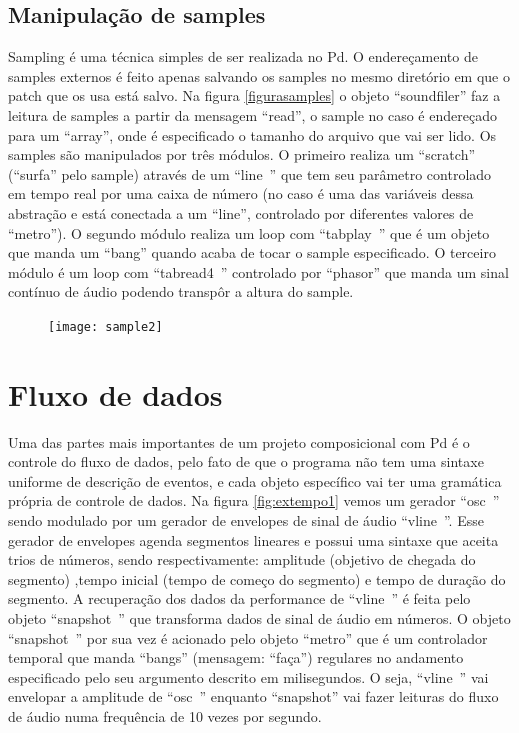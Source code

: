\documentclass[12pt]{article}
\begin{document}
\subsection{Manipulação de samples}
\label{sec:manip-de-sampl}
Sampling é uma técnica simples de ser realizada no Pd. O endereçamento de samples externos é feito apenas 
salvando os samples no mesmo diretório em que o patch que os usa está salvo. Na figura 
\ref{figurasamples} o objeto “soundfiler” faz a leitura de samples a partir da mensagem “read”, o sample 
no caso é endereçado para um “array”, onde é especificado o tamanho do arquivo que vai ser lido. Os samples 
são manipulados por três módulos. O primeiro realiza um “scratch” (“surfa” pelo sample) através de um 
“line~” que tem seu parâmetro controlado em tempo real por uma caixa de número (no caso é uma das 
variáveis dessa abstração e está conectada a um “line”, controlado por diferentes valores de “metro”).  
O segundo módulo realiza um loop com “tabplay~” que é um objeto que manda um “bang” quando acaba 
de tocar o sample especificado. O terceiro módulo é um loop com “tabread4~” controlado por “phasor” que 
manda um sinal contínuo de áudio podendo transpôr a altura do sample.

\begin{figure}[hp]
  \centering
  \texttt{[image: sample2]}
  \caption{}
    \label{fig:}
\end{figure}

\section{Fluxo de dados}
\label{sec:fluxo-de-dados}

Uma das partes mais importantes de um projeto composicional com Pd é o controle do fluxo de dados,
 pelo fato de que o programa não tem uma sintaxe uniforme de descrição de eventos, e cada objeto específico 
 vai ter uma gramática própria de controle de dados. Na figura \ref{fig:extempo1} vemos um gerador 
 “osc~” sendo modulado por um gerador de envelopes de sinal de áudio “vline~”. Esse gerador de envelopes 
 agenda segmentos lineares e possui uma sintaxe que aceita trios de números, sendo respectivamente:
  amplitude (objetivo de chegada do segmento) ,tempo inicial (tempo de começo do segmento) e tempo 
  de duração do segmento. A recuperação dos dados da performance de “vline~” é feita pelo objeto 
  “snapshot~” que transforma dados de sinal de áudio em números. O objeto “snapshot~” por sua vez é 
  acionado pelo objeto “metro” que é um controlador temporal que manda “bangs” (mensagem: “faça”) 
  regulares no andamento especificado pelo seu argumento descrito em milisegundos. O seja, “vline~” 
  vai envelopar a amplitude de “osc~” enquanto “snapshot” vai fazer leituras do fluxo de áudio numa 
  frequência de 10  vezes por segundo.
\end{document}
